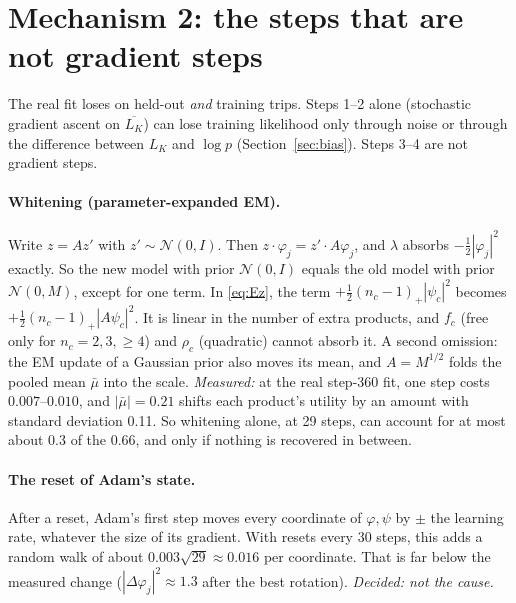\documentclass[11pt]{article}
\theoremstyle{remark}\newtheorem{remark}{Remark}
\newcommand{\N}{\mathcal{N}}
\begin{document}
\section{Mechanism 2: the steps that are not gradient steps}\label{sec:proc}

The real fit loses on held-out \emph{and} training trips. Steps 1--2 alone (stochastic gradient
ascent on $\overline{L_K}$) can lose training likelihood only through noise or through the
difference between $L_K$ and $\log p$ (Section~\ref{sec:bias}). Steps 3--4 are not gradient steps.

\paragraph{Whitening (parameter-expanded EM).} Write $z=Az'$ with $z'\sim\N(0,I)$. Then
$z\cdot\varphi_j=z'\cdot A\varphi_j$, and $\lambda$ absorbs $-\frac12|\varphi_j|^2$ exactly. So the
new model with prior $\N(0,I)$ equals the old model with prior $\N(0,M)$, except for one term. In
\eqref{eq:Ez}, the term $+\frac12(n_c-1)_+|\psi_c|^2$ becomes
$+\frac12(n_c-1)_+|A\psi_c|^2$. It is linear in the number of extra products, and $f_c$ (free
only for $n_c=2,3,\ge4$) and $\rho_c$ (quadratic) cannot absorb it. A second omission: the EM
update of a Gaussian prior also moves its mean, and $A=M^{1/2}$ folds the pooled mean $\bar\mu$
into the scale.
\emph{Measured:} at the real step-360 fit, one step costs $0.007$--$0.010$, and $|\bar\mu|=0.21$
shifts each product's utility by an amount with standard deviation 0.11. So whitening alone, at
29 steps, can account for at most about $0.3$ of the $0.66$, and only if nothing is recovered in
between.

\paragraph{The reset of Adam's state.} After a reset, Adam's first step moves every coordinate of
$\varphi,\psi$ by $\pm$ the learning rate, whatever the size of its gradient. With resets every 30
steps, this adds a random walk of about $0.003\sqrt{29}\approx0.016$ per coordinate. That is far
below the measured change ($|\Delta\varphi_j|^2\approx1.3$ after the best rotation). \emph{Decided: not the cause.}
\end{document}
